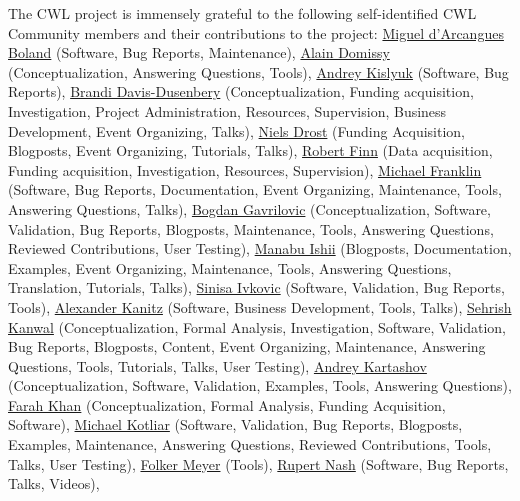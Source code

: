 \documentclass[sigconf,revew,screen,timestamp,nonacm]{acmart}
\newcommand{\contributor}[3]
{\normalsize\href{#1}{#2} \small(#3)\normalsize}
\begin{document}
\begin{acks}
The CWL project is immensely grateful to the following self-identified CWL Community members and their contributions to the project:
\contributor{https://orcid.org/0000-0002-2703-8936}{Miguel d'Arcangues Boland}{Software, Bug Reports, Maintenance},
\contributor{}{Alain Domissy}{Conceptualization, Answering Questions, Tools},
\contributor{}{Andrey Kislyuk}{Software, Bug Reports},
\contributor{https://orcid.org/0000-0001-7811-8613}{Brandi Davis-Dusenbery}{Conceptualization, Funding acquisition, Investigation, Project Administration, Resources, Supervision, Business
Development, Event Organizing, Talks},
\contributor{https://orcid.org/0000-0001-9795-7981}{Niels Drost}{Funding Acquisition, Blogposts, Event Organizing, Tutorials, Talks},
\contributor{https://orcid.org/0000-0001-8626-2148}{Robert Finn}{Data acquisition, Funding acquisition, Investigation, Resources, Supervision},
\contributor{https://orcid.org/0000-0001-9292-1533}{Michael Franklin}{Software, Bug Reports, Documentation, Event Organizing, Maintenance, Tools, Answering Questions, Talks},
\contributor{https://orcid.org/0000-0003-1550-1716}{Bogdan Gavrilovic}{Conceptualization, Software, Validation, Bug Reports, Blogposts, Maintenance, Tools, Answering Questions, Reviewed Contributions, User Testing},
\contributor{https://orcid.org/0000-0002-5843-4712}{Manabu Ishii}{Blogposts, Documentation, Examples, Event Organizing, Maintenance, Tools, Answering Questions, Translation, Tutorials, Talks},
\contributor{https://orcid.org/0000-0003-4115-3313}{Sinisa Ivkovic}{Software, Validation, Bug Reports, Tools},
\contributor{https://orcid.org/0000-0002-3468-0652}{Alexander Kanitz}{Software, Business Development, Tools, Talks},
\contributor{https://orcid.org/0000-0002-5044-4692}{Sehrish Kanwal}{Conceptualization, Formal Analysis, Investigation, Software, Validation, Bug Reports, Blogposts, Content, Event Organizing, Maintenance, Answering Questions, Tools, Tutorials, Talks, User Testing},
\contributor{https://orcid.org/0000-0001-9102-5681}{Andrey Kartashov}{Conceptualization, Software, Validation, Examples, Tools, Answering Questions},
\contributor{https://orcid.org/0000-0002-6337-3037}{Farah Khan}{Conceptualization, Formal Analysis, Funding Acquisition, Software},
\contributor{https://orcid.org/0000-0002-6486-3898}{Michael Kotliar}{Software, Validation, Bug Reports, Blogposts, Examples, Maintenance, Answering Questions, Reviewed Contributions, Tools, Talks, User Testing},
\contributor{https://orcid.org/0000-0003-1112-2284}{Folker Meyer}{Tools},
\contributor{https://orcid.org/0000-0002-6388-7353}{Rupert Nash}{Software, Bug Reports, Talks, Videos},

\end{acks}
\end{document}
